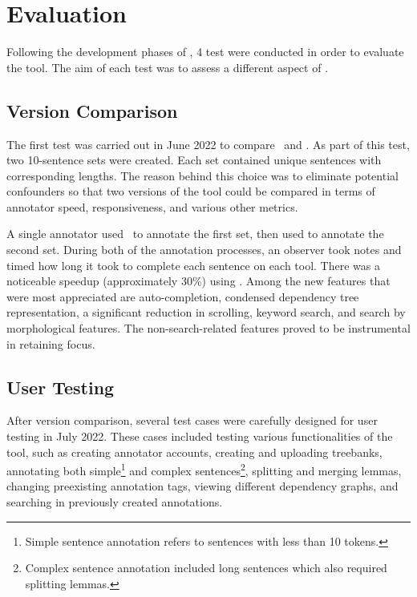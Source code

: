 \section{Evaluation}
\label{sec:evaluation}

Following the development phases of \boatvtwo, 4 test were conducted in order to evaluate the tool. The aim of each test was to assess a different aspect of \boatvtwo. 

\subsection{Version Comparison}
The first test was carried out in June 2022 to compare \boatvone\ and \boatvtwo. As part of this test, two 10-sentence sets were created. Each set contained unique sentences with corresponding lengths. The reason behind this choice was to eliminate potential confounders so that two versions of the tool could be compared in terms of annotator speed, responsiveness, and various other metrics. 

A single annotator used \boatvone\ to annotate the first set, then used \boatvtwo to annotate the second set.
During both of the annotation processes, an observer took notes and timed how long it took to complete each sentence on each tool.
There was a noticeable speedup (approximately 30\%) using \boatvtwo.
Among the new features that were most appreciated are auto-completion, condensed dependency tree representation, a significant reduction in scrolling, keyword search, and search by morphological features.
The non-search-related features proved to be instrumental in retaining focus.

\subsection{User Testing}
After version comparison, several test cases were carefully designed for user testing in July 2022.
These cases included testing various functionalities of the tool, such as creating annotator accounts, creating and uploading treebanks, annotating both simple\footnote{Simple sentence annotation refers to sentences with less than 10 tokens.} and complex sentences\footnote{Complex sentence annotation included long sentences which also required splitting lemmas.}, splitting and merging lemmas, changing preexisting annotation tags, viewing different dependency graphs, and searching in previously created annotations.


